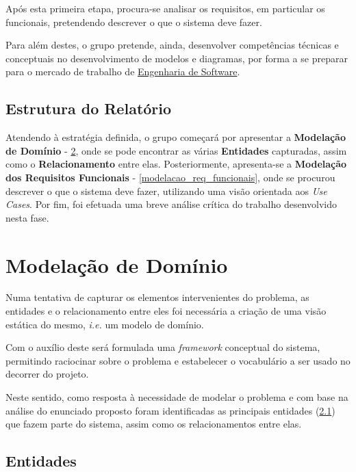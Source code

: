 \documentclass[a4paper,12pt]{scrreprt}
\begin{document}
Após esta primeira etapa, procura-se analisar os requisitos, em particular os funcionais, pretendendo descrever o que o sistema deve fazer.

Para além destes, o grupo pretende, ainda, desenvolver competências técnicas e conceptuais no desenvolvimento de modelos e diagramas,
por forma a se preparar para o mercado de trabalho de \underline{Engenharia de Software}.

\section{Estrutura do Relatório}
Atendendo à estratégia definida, o grupo começará por apresentar a \textbf{Modelação de Domínio} - \ref{modelacao_dominio},
onde se pode encontrar as várias \textbf{Entidades} capturadas, assim como o \textbf{Relacionamento} entre elas.
Posteriormente, apresenta-se a \textbf{Modelação dos Requisitos Funcionais} - \ref{modelacao_req_funcionais}, 
onde se procurou descrever o que o sistema deve fazer, utilizando uma visão orientada aos \textit{Use Cases}.
Por fim, foi efetuada uma breve análise crítica do trabalho desenvolvido nesta fase.


\chapter{Modelação de Domínio} \label{modelacao_dominio}
Numa tentativa de capturar os elementos intervenientes do problema, as entidades e o relacionamento entre eles foi necessária
a criação de uma visão estática do mesmo, \textit{i.e.} um modelo de domínio. 

Com o auxílio deste será formulada uma \textit{framework} conceptual do sistema, permitindo raciocinar sobre o problema e estabelecer o 
vocabulário a ser usado no decorrer do projeto.

Neste sentido, como resposta à necessidade de modelar o problema e com base na análise do enunciado proposto foram identificadas as 
principais entidades (\ref{ent}) que fazem parte do sistema, assim como os relacionamentos entre elas. 

\section{Entidades}\label{ent}
\end{document}
